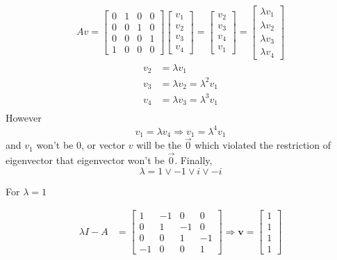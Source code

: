 \documentclass[12pt,a4paper]{article}
\begin{document}
\begin{align*}
	Av = \begin{bmatrix}
		0 & 1 & 0 & 0\\
		0 & 0 & 1 & 0\\
		0 & 0 & 0 & 1\\
		1 & 0 & 0 & 0
	\end{bmatrix} \begin{bmatrix}
	v_1 \\ v_2 \\ v_3 \\ v_4
	\end{bmatrix} = \begin{bmatrix}
	v_2 \\ v_3 \\ v_4 \\ v_1 
	\end{bmatrix} = \begin{bmatrix}
	\lambda v_1 \\ \lambda v_2 \\ \lambda v_3 \\ \lambda v_4
	\end{bmatrix}
\end{align*}
\begin{align*}
	v_2 &= \lambda v_1 \\
	v_3 &= \lambda v_2 = \lambda^2 v_1 \\
	v_4 &= \lambda v_3 = \lambda^3 v_1 \\
\end{align*}
However
\[
v_1 = \lambda v_4 \Rightarrow v_1 = \lambda^4 v_1
\]
and $v_1$ won't be $0$, or vector $v$ will be the $\vec 0$ which violated the restriction of eigenvector that eigenvector won't be $\vec 0$.
Finally, 
\[
\lambda = 1 \lor -1 \lor i \lor -i
\]

For $\lambda = 1$

\begin{align*}
	\lambda I - A &= \begin{bmatrix}
		1 & -1 & 0 & 0 \\
		0 & 1 & -1 & 0 \\
		0 & 0 & 1 & -1 \\
		-1 & 0 & 0 & 1
	\end{bmatrix} \Rightarrow \mathbf v = \begin{bmatrix}
	1 \\ 1\\ 1\\ 1
	\end{bmatrix}
\end{align*}
\end{document}
